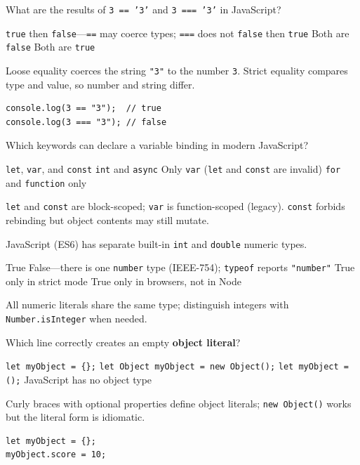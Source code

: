 \question[4]
What are the results of \texttt{3 == '3'} and \texttt{3 === '3'} in JavaScript?
\begin{choices}
  \CorrectChoice \texttt{true} then \texttt{false}---\texttt{==} may coerce types; \texttt{===} does not
  \choice \texttt{false} then \texttt{true}
  \choice Both are \texttt{false}
  \choice Both are \texttt{true}
\end{choices}
\begin{solution}
  Loose equality coerces the string \texttt{"3"} to the number \texttt{3}. Strict equality compares type and value, so number and string differ.
\begin{lstlisting}[style=jsexam]
console.log(3 == "3");  // true
console.log(3 === "3"); // false
\end{lstlisting}
\end{solution}

\question[4]
Which keywords can declare a variable binding in modern JavaScript?
\begin{choices}
  \CorrectChoice \texttt{let}, \texttt{var}, and \texttt{const}
  \choice \texttt{int} and \texttt{async}
  \choice Only \texttt{var} (\texttt{let} and \texttt{const} are invalid)
  \choice \texttt{for} and \texttt{function} only
\end{choices}
\begin{solution}
  \texttt{let} and \texttt{const} are block-scoped; \texttt{var} is function-scoped (legacy). \texttt{const} forbids rebinding but object contents may still mutate.
\end{solution}

\question[4]
JavaScript (ES6) has separate built-in \texttt{int} and \texttt{double} numeric types.
\begin{choices}
  \choice True
  \CorrectChoice False---there is one \texttt{number} type (IEEE-754); \texttt{typeof} reports \texttt{"number"}
  \choice True only in strict mode
  \choice True only in browsers, not in Node
\end{choices}
\begin{solution}
  All numeric literals share the same type; distinguish integers with \texttt{Number.isInteger} when needed.
\end{solution}

\question[4]
Which line correctly creates an empty \textbf{object literal}?
\begin{choices}
  \CorrectChoice \texttt{let myObject = \{\};}
  \choice \texttt{let Object myObject = new Object();}
  \choice \texttt{let myObject = ();}
  \choice JavaScript has no object type
\end{choices}
\begin{solution}
  Curly braces with optional properties define object literals; \texttt{new Object()} works but the literal form is idiomatic.
\begin{lstlisting}[style=jsexam]
let myObject = {};
myObject.score = 10;
\end{lstlisting}
\end{solution}


